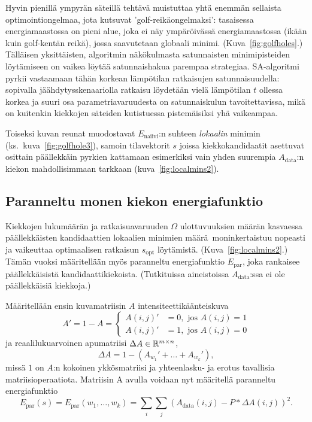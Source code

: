 Hyvin pienillä ympyrän säteillä tehtävä muistuttaa yhtä enemmän sellaista optimointiongelmaa, jota \textcite{salamonetal} kutsuvat 'golf-reikäongelmaksi':
tasaisessa energiamaastossa on pieni alue, joka ei näy ympäröivässä energiamaastossa (ikään kuin golf-kentän reikä), jossa saavutetaan globaali minimi.
(Kuva~\ref{fig:golfholes}.)
Tälläisen yksittäisten, algoritmin näkökulmasta satunnaisten minimipisteiden löytämiseen on vaikea löytää satunnaishakua parempaa strategiaa.
SA-algoritmi pyrkii vastaamaan tähän korkean lämpötilan ratkaisujen satunnaisuudella:
sopivalla jäähdytysskenaariolla ratkaisu löydetään vielä lämpötilan $t$ ollessa korkea ja suuri osa parametriavaruudesta on satunnaiskulun tavoitettavissa,
mikä on kuitenkin kiekkojen säteiden kutistuessa pistemäisiksi yhä vaikeampaa.

Toiseksi kuvan reunat muodostavat $E_\text{naiivi}$:n suhteen \emph{lokaalin} minimin (ks.~kuva~\ref{fig:golfhole3}),
samoin tilavektorit $s$ joissa kiekkokandidaatit asettuvat osittain päällekkäin pyrkien kattamaan esimerkiksi vain yhden suurempia $A_\text{data}$:n kiekon mahdollisimmaan tarkkaan (kuva~\ref{fig:localmins2}).

\subsection{Paranneltu monen kiekon energiafunktio}
\label{sub:paranneltu_monen_kiekon_energiafunktio}

Kiekkojen lukumäärän ja ratkaisuavaruuden $\Omega$ ulottuvuuksien määrän kasvaessa päällekkäisten kandidaattien lokaalien minimien määrä moninkertaistuu nopeasti
ja vaikeuttaa optimaalisen ratkaisun $s_\text{opt}$ löytämistä. (Kuva~\ref{fig:localmins2}.)
Tämän vuoksi määritellään myös paranneltu energiafunktio $E_\text{par}$,
joka rankaisee päällekkäisistä kandidaattikiekoista.
(Tutkituissa aineistoissa $A_{\text{data}}$:ssa ei ole päällekkäisiä kiekkoja.)

Määritellään ensin kuvamatriisin $A$ intensiteettikäänteiskuva
\begin{equation*}
    A' = 1 - A =
        \begin{cases}
            A(i,j)' &= 0, \text{ jos } A(i,j) = 1\\
            A(i,j)' &= 1, \text{ jos } A(i,j) = 0
        \end{cases}
\end{equation*}
ja reaalilukuarvoinen apumatriisi $\Delta A \in \mathbb{R}^{m\times n}$,
\begin{equation}
    \Delta A = 1 - \left( A_{w_1}' + \dots + A_{w_k}' \right),
\end{equation}
missä $1$ on $A$:n kokoinen ykkösmatriisi ja yhteenlasku- ja erotus tavallisia matriisioperaatiota.
Matriisin \Delta A avulla voidaan nyt määritellä paranneltu energiafunktio
\begin{equation}
    \label{eq:paranneltu_energiafunktio}
    E_\text{par}(s) = E_\text{par}(w_1, \dots, w_k) = \sum_i \sum_j \left(  A_{\text{data}}(i,j) - P \ast \Delta A(i,j) \right)^2.
\end{equation}

